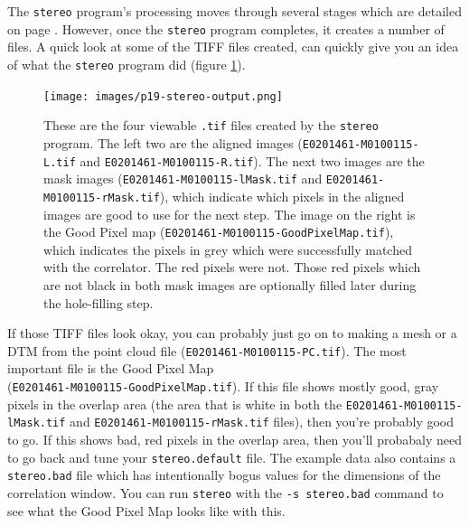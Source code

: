 The \texttt{stereo} program's processing moves through several
stages which are detailed on page \pageref{entrypoints}.  However,
once the \texttt{stereo} program completes, it creates a number of
files.  A quick look at some of the TIFF files created, can quickly
give you an idea of what the \texttt{stereo} program did (figure
\ref{p19-stereo-output}).

\begin{figure}
\begin{center}
\texttt{[image: images/p19-stereo-output.png]}
\caption[P19 stereo output images]{
    \label{p19-stereo-output}
	These are the four viewable \texttt{.tif} files created by
	the \texttt{stereo} program.  The left two are the aligned
	images (\texttt{E0201461-M0100115-L.tif} and
	\texttt{E0201461-M0100115-R.tif}).  The next two images are
	the mask images (\texttt{E0201461-M0100115-lMask.tif} and
	\texttt{E0201461-M0100115-rMask.tif}), which indicate which
	pixels in the aligned images are good to use for the next
	step.  The image on the right is the Good Pixel map
	(\texttt{E0201461-M0100115-GoodPixelMap.tif}), which indicates
	the pixels in grey which were successfully matched with the
	correlator.  The red pixels were not.  Those red pixels which
	are not black in both mask images are optionally filled later
	during the hole-filling step.
    }
\end{center}
\end{figure}

%

If those TIFF files look okay, you can probably just go on to making
a mesh or a DTM from the point cloud file
(\texttt{E0201461-M0100115-PC.tif}).  The most important file is
the Good Pixel Map \\
(\texttt{E0201461-M0100115-GoodPixelMap.tif}).
If this file shows mostly good, gray pixels in the overlap area
(the area that is white in both the \texttt{E0201461-M0100115-lMask.tif}
and \texttt{E0201461-M0100115-rMask.tif} files), then you're probably
good to go.  If this shows bad, red pixels in the overlap area,
then you'll probabaly need to go back and tune your \texttt{stereo.default}
file.  The example data also contains a \texttt{stereo.bad} file
which has intentionally bogus values for the dimensions of the
correlation window.  You can run \texttt{stereo} with the \texttt{-s
stereo.bad} command to see what the Good Pixel Map looks like with
this.

